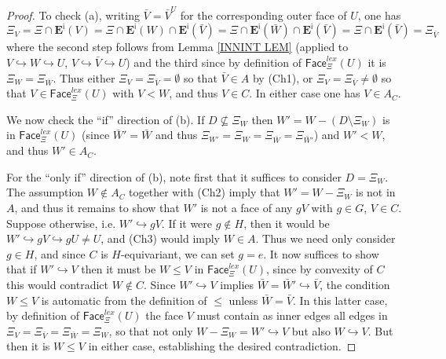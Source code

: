 \documentclass[a4paper,10pt
 ,draft
]{article}%
\begin{document}
\begin{proof}
To check (a), writing $\bar{V}=\bar{V}^U$ for the corresponding outer face of $U$, one has
	\[
	\Xi_V = \Xi \cap \boldsymbol{E}^{\mathsf{i}} (V) 
	= \Xi \cap \boldsymbol{E}^{\mathsf{i}}(W) \cap \boldsymbol{E}^{\mathsf{i}}(\bar{V})
	= \Xi \cap \boldsymbol{E}^{\mathsf{i}}(\bar{W}) \cap \boldsymbol{E}^{\mathsf{i}}(\bar{V})
	= \Xi \cap \boldsymbol{E}^{\mathsf{i}}(\bar{V})
	= \Xi_{\bar{V}}
	\]
where the second step follows from Lemma \ref{INNINT LEM}
(applied to $V \hookrightarrow W \hookrightarrow U$, 
$V \hookrightarrow \bar{V} \hookrightarrow U$)
and the third since by definition of
$\mathsf{Face}_{\Xi}^{lex}(U)$ it is $\Xi_{W} = \Xi_{\bar{W}}$.
Thus either $\Xi_V= \Xi_{\bar{V}} = \emptyset$ so that $\bar{V}\in A$ by (Ch1),
or $\Xi_V = \Xi_{\bar{V}} \neq \emptyset$
so that $V \in \mathsf{Face}_{\Xi}^{lex}(U)$ with $V<W$, and thus $V\in C$. In either case one has $V \in A_C$.

We now check the ``if'' direction of (b).
If $D \not \subseteq \Xi_{W}$
then $W' = W - (D \setminus \Xi_{W})$
is in $\mathsf{Face}_{\Xi}^{lex}(U)$
(since $\bar{W}' = \bar{W}$ and thus
$\Xi_{W'} = \Xi_{W}  = \Xi_{\bar{W}} = \Xi_{\bar{W}'}$)
and $W'<W$, and thus $W' \in A_C$.

For the ``only if'' direction of (b), 
note first that it suffices to consider $D = \Xi_W$.
The assumption $W \not \in A_C$ together with (Ch2) imply that
$W'=W-\Xi_{W}$ is not in $A$, and thus it remains to show that 
$W'$ is not a face of any $gV$ with $g\in G$, $V \in C$.
Suppose otherwise, i.e. $W' \hookrightarrow gV$.
If it were $g \not \in H$, 
then it would be $W' \hookrightarrow gV \hookrightarrow g U \neq U$, and (Ch3) would imply $W\in A$. Thus we need only consider $g\in H$, and since $C$ is $H$-equivariant, we can set $g=e$.
It now suffices to show that if $W' \hookrightarrow V$
then it must be $W \leq V$ in $\mathsf{Face}_{\Xi}^{lex}(U)$,
since by convexity of $C$ this would contradict $W \not \in C$.
Since $W' \hookrightarrow V$ implies 
$\bar{W} = \bar{W}' \hookrightarrow \bar{V}$,
the condition $W \leq V$ is automatic from the definition of $\leq$ unless $\bar{W} = \bar{V}$.
In this latter case, by definition of 
$\mathsf{Face}_{\Xi}^{lex}(U)$ the face $V$ must contain as inner edges all edges in 
$\Xi_V = \Xi_{\bar{V}} = \Xi_{\bar{W}} = \Xi_{W}$,
so that not only $W - \Xi_{W} = W' \hookrightarrow V$ but also $W \hookrightarrow V$. But then it is $W \leq V$ in either case, establishing the desired contradiction. 


\end{proof}
\end{document}
